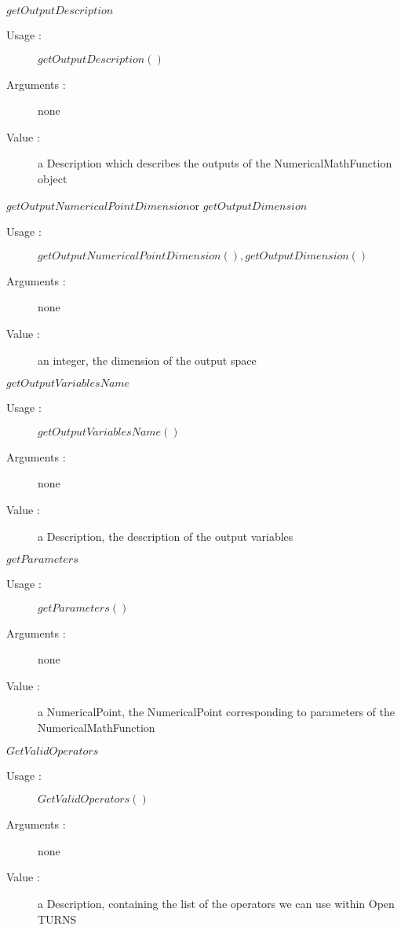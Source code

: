 \begin{description}
\begin{description}
  \item $getOutputDescription$
    \begin{description}
    \item[Usage :] $getOutputDescription()$
    \item[Arguments :] none
    \item[Value :] a Description which describes the outputs
      of the NumericalMathFunction object
    \end{description}
    \bigskip

  \item $getOutputNumericalPointDimension$or   $getOutputDimension$
    \begin{description}
    \item[Usage :] $getOutputNumericalPointDimension(), getOutputDimension()$
    \item[Arguments :] none
    \item[Value :] an integer, the dimension of the output space
    \end{description}
    \bigskip


  \item $getOutputVariablesName$
    \begin{description}
    \item[Usage :] $getOutputVariablesName()$
    \item[Arguments :] none
    \item[Value :] a Description, the description of the output variables
    \end{description}
    \bigskip


  \item $getParameters$
    \begin{description}
    \item[Usage :] $getParameters()$
    \item[Arguments :] none
    \item[Value :] a NumericalPoint, the NumericalPoint
      corresponding to parameters of the NumericalMathFunction
    \end{description}
    \bigskip


  \item $GetValidOperators$
    \begin{description}
    \item[Usage :] $GetValidOperators()$
    \item[Arguments :] none
    \item[Value :] a Description, containing the list of the operators we can use within Open TURNS
    \end{description}
    \bigskip



\end{description}
\end{description}
